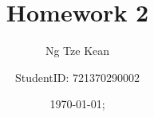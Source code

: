 \documentclass[12pt]{article}
\begin{document}
 
\title{Homework 2}
\author{Ng Tze Kean}
\author{StudentID: 721370290002}
\date{\today; \currenttime}
\maketitle


 

\newcommand{\code}{\texttt}

    
    \newpage
    
    \newpage
    
    \newpage
    
\end{document}

